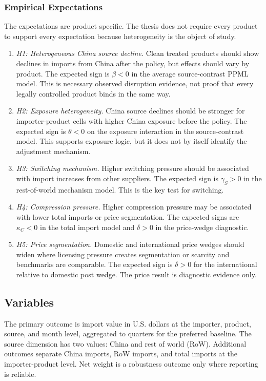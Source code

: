 \documentclass[12pt,a4paper]{article}
\numberwithin{equation}{section}
\begin{document}
\subsubsection{Empirical Expectations}

The expectations are product specific. The thesis does not require every product to support every expectation because heterogeneity is the object of study.

\begin{enumerate}
\item \emph{H1: Heterogeneous China source decline.} Clean treated products should show declines in imports from China after the policy, but effects should vary by product. The expected sign is \(\beta<0\) in the average source-contrast PPML model. This is necessary observed disruption evidence, not proof that every legally controlled product binds in the same way.
\item \emph{H2: Exposure heterogeneity.} China source declines should be stronger for importer-product cells with higher China exposure before the policy. The expected sign is \(\theta<0\) on the exposure interaction in the source-contrast model. This supports exposure logic, but it does not by itself identify the adjustment mechanism.
\item \emph{H3: Switching mechanism.} Higher switching pressure should be associated with import increases from other suppliers. The expected sign is \(\gamma_S>0\) in the rest-of-world mechanism model. This is the key test for switching.
\item \emph{H4: Compression pressure.} Higher compression pressure may be associated with lower total imports or price segmentation. The expected signs are \(\kappa_C<0\) in the total import model and \(\delta>0\) in the price-wedge diagnostic.
\item \emph{H5: Price segmentation.} Domestic and international price wedges should widen where licensing pressure creates segmentation or scarcity and benchmarks are comparable. The expected sign is \(\delta>0\) for the international relative to domestic post wedge. The price result is diagnostic evidence only.
\end{enumerate}

\subsection{Variables}

The primary outcome is import value in U.S. dollars at the importer, product, source, and month level, aggregated to quarters for the preferred baseline. The source dimension has two values: China and rest of world (RoW). Additional outcomes separate China imports, RoW imports, and total imports at the importer-product level. Net weight is a robustness outcome only where reporting is reliable.
\end{document}
